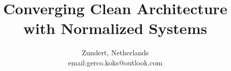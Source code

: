 \title{\bfseries\Large Converging Clean Architecture with Normalized Systems}

\author{
Zundert, Netherlands \\
email:gerco.koks@outlook.com}

\maketitle